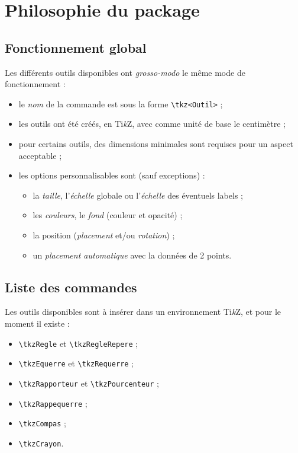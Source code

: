 \documentclass[french,a4paper,11pt]{article}
\providecommand\tikzlogo{Ti\textit{k}Z}
\let\TikZ\tikzlogo
\begin{document}
\section{Philosophie du package}

\subsection{Fonctionnement global}

\begin{tipblock}
Les différents outils disponibles ont \textit{grosso-modo} le même mode de fonctionnement :

\begin{itemize}
	\item le \textit{nom} de la commande est sous la forme \texttt{\textbackslash tkz<Outil>} ;
	\item les outils ont été créés, en \TikZ, avec comme unité de base le centimètre ;
	\item pour certains outils, des dimensions minimales sont requises pour un aspect acceptable ;
	\item les options personnalisables sont (sauf exceptions) :
	\begin{itemize}
		\item la \textit{taille}, l'\textit{échelle} globale ou l'\textit{échelle} des éventuels labels ;
		\item les \textit{couleurs}, le \textit{fond} (couleur et opacité) ;
		\item la position (\textit{placement} et/ou \textit{rotation}) ;
		\item un \textit{placement automatique} avec la données de 2 points.
	\end{itemize}
\end{itemize}
\vspace*{-\baselineskip}\leavevmode
\end{tipblock}

\subsection{Liste des commandes}

\begin{cautionblock}
Les outils disponibles sont à insérer dans un environnement \TikZ, et pour le moment il existe :
\begin{itemize}
	\item \texttt{\textbackslash tkzRegle} et \texttt{\textbackslash tkzRegleRepere} ;
	\item \texttt{\textbackslash tkzEquerre} et \texttt{\textbackslash tkzRequerre} ;
	\item \texttt{\textbackslash tkzRapporteur} et \texttt{\textbackslash tkzPourcenteur} ;
	\item \texttt{\textbackslash tkzRappequerre} ;
	\item \texttt{\textbackslash tkzCompas} ;
	\item \texttt{\textbackslash tkzCrayon}.
\end{itemize}
\vspace*{-\baselineskip}\leavevmode
\end{cautionblock}
\end{document}
